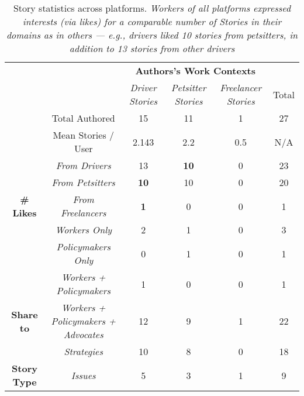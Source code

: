 \begin{table*}[h]
\begin{tabular}{cc|ccc|c}
\cline{3-5}
 &  & \multicolumn{3}{c|}{\textbf{Authors's Work Contexts}} &  \\ \cline{3-6} 
 &  & \multicolumn{1}{c|}{\textit{Driver Stories}} & \multicolumn{1}{c|}{\textit{Petsitter Stories}} & \textit{Freelancer Stories} & Total \\ \cline{2-6} 
\multicolumn{1}{c|}{} & Total Authored & \multicolumn{1}{c|}{15} & \multicolumn{1}{c|}{11} & 1 & 27 \\ \cline{2-6} 
\multicolumn{1}{c|}{} & Mean Stories / User & \multicolumn{1}{c|}{2.143} & \multicolumn{1}{c|}{2.2} & 0.5 & N/A \\ \hline
\multicolumn{1}{|c|}{} & \textit{From Drivers} & \multicolumn{1}{c|}{13} & \multicolumn{1}{c|}{\textbf{10}} & 0 & 23 \\ \cline{2-6} 
\multicolumn{1}{|c|}{} & \textit{From Petsitters} & \multicolumn{1}{c|}{\textbf{10}} & \multicolumn{1}{c|}{10} & 0 & 20 \\ \cline{2-6} 
\multicolumn{1}{|c|}{\multirow{-3}{*}{\textbf{\# Likes}}} & \textit{From Freelancers} & \multicolumn{1}{c|}{\textbf{1}} & \multicolumn{1}{c|}{0} & 0 & 1 \\ \hline
\multicolumn{1}{|c|}{} & \textit{Workers Only} & \multicolumn{1}{c|}{2} & \multicolumn{1}{c|}{1} & 0 & 3 \\ \cline{2-6} 
\multicolumn{1}{|c|}{} & \textit{Policymakers Only} & \multicolumn{1}{c|}{0} & \multicolumn{1}{c|}{1} & 0 & 1 \\ \cline{2-6} 
\multicolumn{1}{|c|}{} & \textit{Workers + Policymakers} & \multicolumn{1}{c|}{1} & \multicolumn{1}{c|}{0} & 0 & 1 \\ \cline{2-6} 
\multicolumn{1}{|c|}{\multirow{-4}{*}{\textbf{Share to}}} & \textit{Workers + Policymakers + Advocates} & \multicolumn{1}{c|}{12} & \multicolumn{1}{c|}{9} & 1 & 22 \\ \hline
\multicolumn{1}{|c|}{} & \textit{Strategies} & \multicolumn{1}{c|}{10} & \multicolumn{1}{c|}{8} & 0 & 18 \\ \cline{2-6} 
\multicolumn{1}{|c|}{\multirow{-2}{*}{\textbf{Story Type}}} & \textit{Issues} & \multicolumn{1}{c|}{5} & \multicolumn{1}{c|}{3} & 1 & 9 \\ \hline
\end{tabular}
\caption{
Story statistics across platforms. 
\textit{Workers of all platforms expressed interests (via likes) for a comparable number of Stories in their domains as in others --- e.g., drivers liked 10 stories from petsitters, in addition to 13 stories from other drivers}}
\label{story_stats}
\end{table*}